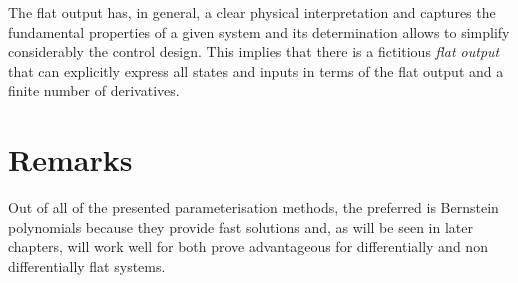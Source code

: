 \par The flat output has, in general, a clear physical interpretation and captures the fundamental properties of a given system and its determination allows to simplify considerably the control design. This implies that there is a fictitious \textit{flat output} that can explicitly express all states and inputs in terms of the flat output and a finite number of derivatives. 



\section{Remarks}

\par Out of all of the presented parameterisation methods, the preferred is Bernstein polynomials because they provide fast solutions and, as will be seen in later chapters, will work well for both prove advantageous for differentially and non differentially flat systems.


